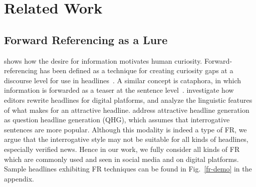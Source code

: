 \label{sec-related}
\section{Related Work}
\subsection{Forward Referencing as a Lure} 
\citet{psychologyofcuriosity} shows how the desire for information motivates
human curiosity. 
Forward-referencing has been defined as a technique for creating curiosity gaps
at a discourse level for use in headlines~\cite{BLOM201587,Yang2011ACI}. 
A similar concept is cataphora, in which information is forwarded as a teaser
at the sentence level~\cite{cataphoric, Halliday76a}. 
\citet{digitalclickbait} investigate how editors rewrite headlines for digital
platforms, and analyze the linguistic features of what makes for an attractive
headline.
\citet{zhang2018question} address attractive headline generation as question
headline generation (QHG), which assumes that interrogative sentences are more
popular. Although this modality is indeed a type of FR, we argue that the
interrogative style may not be suitable for all kinds of headlines, especially
verified news. Hence in our work, we fully consider all kinds of FR which
are commonly used and seen in social media and on digital platforms.
Sample headlines exhibiting FR techniques can be found in
Fig.~\ref{fr-demo} in the appendix.

